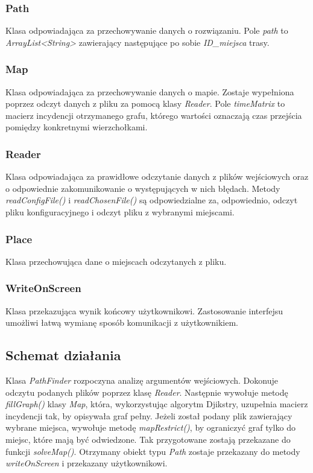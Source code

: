 \documentclass{article}
\begin{document}
\subsubsection{Path}
Klasa odpowiadająca za przechowywanie danych o rozwiązaniu. Pole \textit{path} to \textit{ArrayList<String>} zawierający następujące po sobie \textit{ID\_miejsca} trasy.

\subsubsection{Map}
Klasa odpowiadająca za przechowywanie danych o mapie. Zostaje wypełniona poprzez odczyt danych z pliku za pomocą klasy \textit{Reader}. Pole \textit{timeMatrix} to macierz incydencji otrzymanego grafu, którego wartości oznaczają czas przejścia pomiędzy konkretnymi wierzchołkami.

\subsubsection{Reader}
Klasa odpowiadająca za prawidłowe odczytanie danych z plików wejściowych oraz o odpowiednie zakomunikowanie o występujących w nich błędach. Metody \textit{readConfigFile()} i \textit{readChosenFile()} są odpowiedzialne za, odpowiednio, odczyt pliku konfiguracyjnego i odczyt pliku z wybranymi miejscami.

\subsubsection{Place}
Klasa przechowująca dane o miejscach odczytanych z pliku.

\subsubsection{WriteOnScreen}
Klasa przekazująca wynik końcowy użytkownikowi. Zastosowanie interfejsu umożliwi łatwą wymianę sposób komunikacji z użytkownikiem.

\subsection{Schemat działania}
Klasa \textit{PathFinder} rozpoczyna analizę argumentów wejściowych. Dokonuje odczytu podanych plików poprzez klasę \textit{Reader}. Następnie wywołuje metodę \textit{fillGraph()} klasy \textit{Map}, która, wykorzystując algorytm Djikstry, uzupełnia macierz incydencji tak, by opisywała graf pełny. Jeżeli został podany plik zawierający wybrane miejsca, wywołuje metodę \textit{mapRestrict()}, by ograniczyć graf tylko do miejsc, które mają być odwiedzone. Tak przygotowane zostają przekazane do funkcji \textit{solveMap()}. Otrzymany obiekt typu \textit{Path} zostaje przekazany do metody \textit{writeOnScreen} i przekazany użytkownikowi. 
\end{document}
